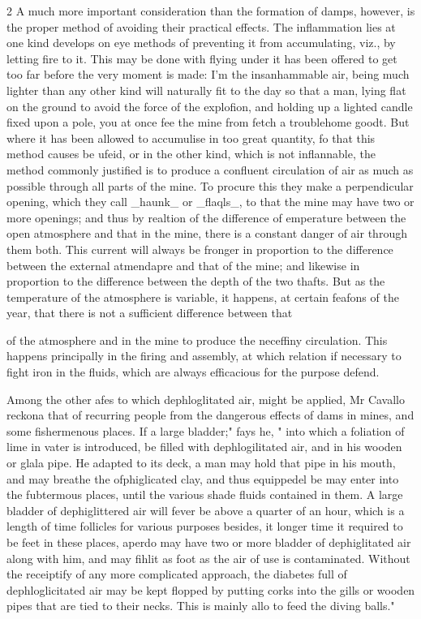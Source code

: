 \documentclass[10pt]{article}
\begin{document}
\begin{multicols}{2}
A much more important consideration than the formation of damps, however, is the proper method of avoiding their practical effects. The inflammation lies at one kind develops on eye methods of preventing it from accumulating, viz., by letting fire to it. This may be done with flying under it has been offered to get too far before the very moment is made: I’m the insanhammable air, being much lighter than any other kind will naturally fit to the day so that a man, lying flat on the ground to avoid the force of the explofion, and holding up a lighted candle fixed upon a pole, you at once fee the mine from fetch a troublehome goodt. But where it has been allowed to accumulise in too great quantity, fo that this method causes be ufeid, or in the other kind, which is not inflannable, the method commonly justified is to produce a confluent circulation of air as much as possible through all parts of the mine. To procure this they make a perpendicular opening, which they call \_haunk\_ or \_flaqls\_, to that the mine may have two or more openings; and thus by realtion of the difference of emperature between the open atmosphere and that in the mine, there is a constant danger of air through them both. This current will always be fronger in proportion to the difference between the external atmendapre and that of the mine; and likewise in proportion to the difference between the depth of the two thafts. But as the temperature of the atmosphere is variable, it happens, at certain feafons of the year, that there is not a sufficient difference between that

of the atmosphere and in the mine to produce the neceffiny circulation. This happens principally in the firing and assembly, at which relation if necessary to fight iron in the fluids, which are always efficacious for the purpose defend.

Among the other afes to which dephloglitated air, might be applied, Mr Cavallo reckona that of recurring people from the dangerous effects of dams in mines, and some fishermenous places. If a large bladder;" fays he, " into which a foliation of lime in vater is introduced, be filled with dephlogilitated air, and in his wooden or glala pipe. He adapted to its deck, a man may hold that pipe in his mouth, and may breathe the ofphiglicated clay, and thus equippedel be may enter into the fubtermous places, until the various shade fluids contained in them. A large bladder of dephiglittered air will fever be above a quarter of an hour, which is a length of time follicles for various purposes besides, it longer time it required to be feet in these places, aperdo may have two or more bladder of dephiglitated air along with him, and may fihlit as foot as the air of use is contaminated. Without the receiptify of any more complicated approach, the diabetes full of dephloglicitated air may be kept flopped by putting corks into the gills or wooden pipes that are tied to their necks. This is mainly allo to feed the diving balls."


\end{multicols}
\end{document}
